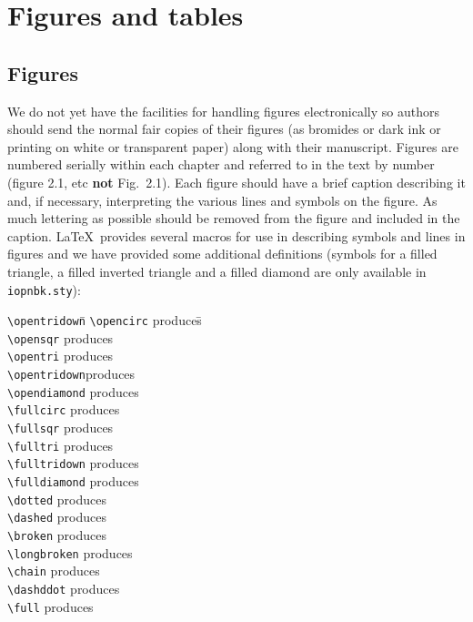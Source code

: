 \chapter{Figures and tables}
\section{Figures}
We do not yet have the facilities for handling 
figures electronically 
so authors should send the normal fair copies of their figures (as 
bromides or dark ink or printing on white or transparent paper) 
along with their 
manuscript. Figures are numbered serially within each chapter and
referred to in the text by number (figure 2.1, etc {\bf not} Fig.\
2.1). Each figure should have a brief caption describing it and, 
if necessary, interpreting the various lines and symbols on the 
figure. As much lettering as possible should be removed from the 
figure and included in the caption\index{figure captions}. 
\LaTeX\ provides several macros 
for use in describing symbols 
and lines in figures and we have
provided some additional definitions 
(symbols for a filled triangle, a filled inverted triangle and a filled
diamond are only available in \verb"iopnbk.sty"):
\begin{tabbing}
\verb"\opentridown"\qquad\=\kill
\verb"\opencirc" \>produces\qquad\=\opencirc\\
\verb"\opensqr" \>produces \>\opensqr\\
\verb"\opentri" \>produces \>\opentri\\
\verb"\opentridown"\>produces\>\opentridown\\
\verb"\opendiamond" \>produces \>\opendiamond\\
\verb"\fullcirc" \>produces \>\fullcirc\\
\verb"\fullsqr" \>produces \>\fullsqr\\
\ifnbk
\verb"\fulltri" \>produces \>\fulltri\\
\verb"\fulltridown" \>produces \>\fulltridown\\
\verb"\fulldiamond" \>produces \>\fulldiamond\\
\fi
\verb"\dotted" \>produces \>\dotted\\
\verb"\dashed" \>produces \>\dashed\\
\verb"\broken" \>produces \>\broken\\
\verb"\longbroken" \>produces \>\longbroken\\
\verb"\chain" \>produces \>\chain\\
\verb"\dashddot" \>produces \>\dashddot\\
\verb"\full" \>produces \>\full\\
\end{tabbing}

